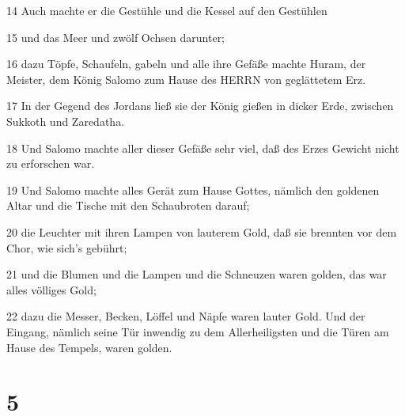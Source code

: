 \par 14 Auch machte er die Gestühle und die Kessel auf den Gestühlen
\par 15 und das Meer und zwölf Ochsen darunter;
\par 16 dazu Töpfe, Schaufeln, gabeln und alle ihre Gefäße machte Huram, der Meister, dem König Salomo zum Hause des HERRN von geglättetem Erz.
\par 17 In der Gegend des Jordans ließ sie der König gießen in dicker Erde, zwischen Sukkoth und Zaredatha.
\par 18 Und Salomo machte aller dieser Gefäße sehr viel, daß des Erzes Gewicht nicht zu erforschen war.
\par 19 Und Salomo machte alles Gerät zum Hause Gottes, nämlich den goldenen Altar und die Tische mit den Schaubroten darauf;
\par 20 die Leuchter mit ihren Lampen von lauterem Gold, daß sie brennten vor dem Chor, wie sich's gebührt;
\par 21 und die Blumen und die Lampen und die Schneuzen waren golden, das war alles völliges Gold;
\par 22 dazu die Messer, Becken, Löffel und Näpfe waren lauter Gold. Und der Eingang, nämlich seine Tür inwendig zu dem Allerheiligsten und die Türen am Hause des Tempels, waren golden.

\chapter{5}

